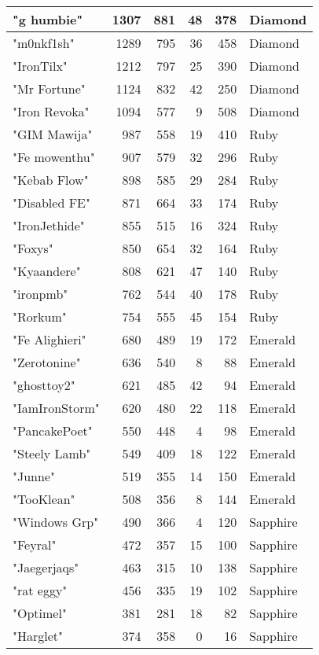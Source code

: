 \documentclass{article}
\begin{document}
\begin{table}[htbp]
\begin{tabular}{|l|r|r|r|r|l|}
"g humbie" & 1307 & 881 & 48 & 378 & Diamond \\ \hline
"m0nkf1sh" & 1289 & 795 & 36 & 458 & Diamond \\ \hline
"IronTilx" & 1212 & 797 & 25 & 390 & Diamond \\ \hline
"Mr Fortune" & 1124 & 832 & 42 & 250 & Diamond \\ \hline
"Iron Revoka" & 1094 & 577 & 9 & 508 & Diamond \\ \hline
"GIM Mawija" & 987 & 558 & 19 & 410 & Ruby \\ \hline
"Fe mowenthu" & 907 & 579 & 32 & 296 & Ruby \\ \hline
"Kebab Flow" & 898 & 585 & 29 & 284 & Ruby \\ \hline
"Disabled FE" & 871 & 664 & 33 & 174 & Ruby \\ \hline
"IronJethide" & 855 & 515 & 16 & 324 & Ruby \\ \hline
"Foxys" & 850 & 654 & 32 & 164 & Ruby \\ \hline
"Kyaandere" & 808 & 621 & 47 & 140 & Ruby \\ \hline
"ironpmb" & 762 & 544 & 40 & 178 & Ruby \\ \hline
"Rorkum" & 754 & 555 & 45 & 154 & Ruby \\ \hline
"Fe Alighieri" & 680 & 489 & 19 & 172 & Emerald \\ \hline
"Zerotonine" & 636 & 540 & 8 & 88 & Emerald \\ \hline
"ghosttoy2" & 621 & 485 & 42 & 94 & Emerald \\ \hline
"IamIronStorm" & 620 & 480 & 22 & 118 & Emerald \\ \hline
"PancakePoet" & 550 & 448 & 4 & 98 & Emerald \\ \hline
"Steely Lamb" & 549 & 409 & 18 & 122 & Emerald \\ \hline
"Junne" & 519 & 355 & 14 & 150 & Emerald \\ \hline
"TooKlean" & 508 & 356 & 8 & 144 & Emerald \\ \hline
"Windows Grp" & 490 & 366 & 4 & 120 & Sapphire \\ \hline
"Feyral" & 472 & 357 & 15 & 100 & Sapphire \\ \hline
"Jaegerjaqs" & 463 & 315 & 10 & 138 & Sapphire \\ \hline
"rat eggy" & 456 & 335 & 19 & 102 & Sapphire \\ \hline
"Optimel" & 381 & 281 & 18 & 82 & Sapphire \\ \hline
"Harglet" & 374 & 358 & 0 & 16 & Sapphire \\ \hline

\end{tabular}
\end{table}
\end{document}
